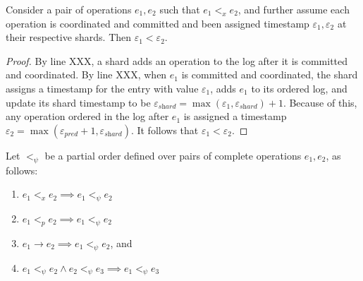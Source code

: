 \begin{lem}
\label{lemma2}
Consider a pair of operations $e_1, e_2$ such that $e_1 <_x e_2$, and further assume each operation is coordinated and committed and been assigned timestamp $\varepsilon_1, \varepsilon_2$ at their respective shards. Then $\varepsilon_1 < \varepsilon_2$.
\end{lem}
\begin{proof}
By line XXX, a shard adds an operation to the log after it is committed and coordinated. By line XXX, when $e_1$ is committed and coordinated, the shard assigns a timestamp for the entry with value $\varepsilon_1$, adds $e_1$ to its ordered log, and update its shard timestamp to be $\varepsilon_{\textit{shard}} = \max(\varepsilon_1, \varepsilon_{\textit{shard}}) + 1$. Because of this, any operation ordered in the log after $e_1$ is assigned a timestamp
 $\varepsilon_2 = \max(\varepsilon_{\textit{pred}}+1, \varepsilon_{\textit{shard}})$.
It follows that $\varepsilon_1 < \varepsilon_2$.



\end{proof}


Let $<_\psi$ be a partial order defined over pairs of complete operations $e_1, e_2$, as follows:
\begin{enumerate}
    \item $e_1 <_x e_2 \implies e_1 <_\psi e_2$
    \item $e_1 <_p e_2 \implies e_1 <_\psi e_2$
    \item $e_1 \rightarrow e_2 \implies e_1 <_\psi e_2$, and
    \item $e_1 <_\psi e_2 \land e_2 <_\psi e_3 \implies e_1 <_\psi e_3$
\end{enumerate}

